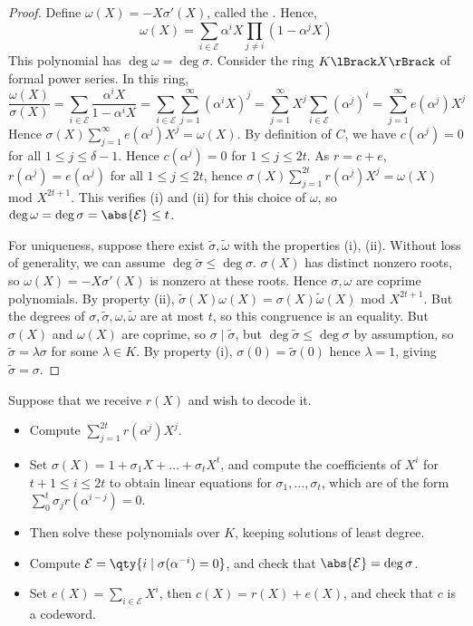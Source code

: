 \begin{proof}
    Define $\omega(X) = -X\sigma'(X)$, called the .
    Hence,
    \[ \omega(X) = \sum_{i \in \mathcal E} \alpha^i X \prod_{j \neq i} (1 - \alpha^j X) \]
    This polynomial has $\deg \omega = \deg \sigma$.
    Consider the ring $K\Brackets{X}$ of formal power series.
    In this ring,
    \[ \frac{\omega(X)}{\sigma(X)} = \sum_{i \in \mathcal E} \frac{\alpha^i X}{1 - \alpha^i X} = \sum_{i \in \mathcal E} \sum_{j = 1}^\infty (\alpha^i X)^j = \sum_{j=1}^\infty X^j \sum_{i \in \mathcal E} (\alpha^j)^i = \sum_{j=1}^\infty e(\alpha^j) X^j \]
    Hence $\sigma(X) \sum_{j=1}^\infty e(\alpha^j) X^j = \omega(X)$.
    By definition of $C$, we have $c(\alpha^j) = 0$ for all $1 \leq j \leq \delta - 1$.
    Hence $c(\alpha^j) = 0$ for $1 \leq j \leq 2t$.
    As $r = c + e$, $r(\alpha^j) = e(\alpha^j)$ for all $1 \leq j \leq 2t$, hence $\sigma(X) \sum_{j=1}^{2t} r(\alpha^j) X^j = \omega(X)$ mod $X^{2t+1}$.
    This verifies (i) and (ii) for this choice of $\omega$, so $\deg \omega = \deg \sigma = \abs{\mathcal E} \leq t$.

    For uniqueness, suppose there exist $\widetilde \sigma, \widetilde \omega$ with the properties (i), (ii).
    Without loss of generality, we can assume $\deg \widetilde \sigma \leq \deg \sigma$.
    $\sigma(X)$ has distinct nonzero roots, so $\omega(X) = -X\sigma'(X)$ is nonzero at these roots.
    Hence $\sigma, \omega$ are coprime polynomials.
    By property (ii), $\widetilde \sigma(X) \omega(X) = \sigma(X) \widetilde \omega(X)$ mod $X^{2t+1}$.
    But the degrees of $\sigma, \widetilde \sigma, \omega, \widetilde \omega$ are at most $t$, so this congruence is an equality.
    But $\sigma(X)$ and $\omega(X)$ are coprime, so $\sigma \mid \widetilde \sigma$, but $\deg \widetilde \sigma \leq \deg \sigma$ by assumption, so $\widetilde \sigma = \lambda \sigma$ for some $\lambda \in K$.
    By property (i), $\sigma(0) = \widetilde\sigma(0)$ hence $\lambda = 1$, giving $\widetilde \sigma = \sigma$.
\end{proof}
Suppose that we receive $r(X)$ and wish to decode it.
\begin{itemize}
    \item Compute $\sum_{j=1}^{2t} r(\alpha^j) X^j$.
    \item Set $\sigma(X) = 1 + \sigma_1 X + \dots + \sigma_t X^t$, and compute the coefficients of $X^i$ for $t + 1 \leq i \leq 2t$ to obtain linear equations for $\sigma_1, \dots, \sigma_t$, which are of the form $\sum_0^t \sigma_j r(\alpha^{i-j}) = 0$.
    \item Then solve these polynomials over $K$, keeping solutions of least degree.
    \item Compute $\mathcal E = \qty{i \mid \sigma(\alpha^{-i}) = 0}$, and check that $\abs{\mathcal E} = \deg \sigma$.
    \item Set $e(X) = \sum_{i \in \mathcal E} X^i$, then $c(X) = r(X) + e(X)$, and check that $c$ is a codeword.
\end{itemize}
